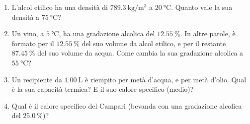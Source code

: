 \begin{enumerate}
    \item L'alcol etilico ha una densità di $\SI{789.3}{\kilogram/\meter^{3}}$ a $\SI{20}{\celsius}$. Quanto vale la sua densità a $\SI{75}{\celsius}$? 
    
    \item Un vino, a $\SI{5}{\celsius}$, ha una gradazione alcolica del $\SI{12,55}{\percent}$. In altre parole, è formato per il $\SI{12,55}{\percent}$ del suo volume da alcol etilico, e per il restante $\SI{87,45}{\percent}$ del suo volume da acqua. Come cambia la sua gradazione alcolica a $\SI{55}{\celsius}$?
    
    \item Un recipiente da $\SI{1,00}{\liter}$ è riempito per metà d'acqua, e per metà d'olio. Qual è la sua capacità termica? E il suo calore specifico (medio)?

    \item Qual è il calore specifico del Campari (bevanda con una gradazione alcolica del $\SI{25,0}{\percent}$)?
\end{enumerate}

